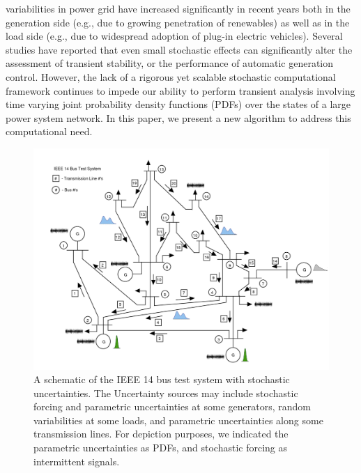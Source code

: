 \documentclass[10pt,twocolumn]{IEEEtran}
\begin{document}
 variabilities in power grid have increased significantly in recent years both in the generation side (e.g., due to growing penetration of renewables) as well as in the load side (e.g., due to widespread adoption of plug-in electric vehicles). Several studies \cite{timko1983monte,nwankpa1992stochastic,odun2012structure,ghanavati2016identifying,apostolopoulou2016assessment} have reported that even small stochastic effects can significantly alter the assessment of transient stability, or the performance of automatic generation control. However, the lack of a rigorous yet scalable stochastic computational framework continues to impede \cite{schwalbe2015mathematical} our ability to perform transient analysis involving time varying joint probability density functions (PDFs) over the states of a large power system network. In this paper, we present a new algorithm to address this computational need.  

\begin{figure}
\centering
\includegraphics[width=\linewidth]{IEEE14BusWithUnc.pdf}
\caption{\small{A schematic of the IEEE 14 bus test system with stochastic uncertainties. The Uncertainty sources may include stochastic forcing and parametric uncertainties at some generators, random variabilities at some loads, and parametric uncertainties along some transmission lines. For depiction purposes, we indicated the parametric uncertainties as PDFs, and stochastic forcing as intermittent signals.}}
\label{fig:Motivating}
\end{figure}
\end{document}
